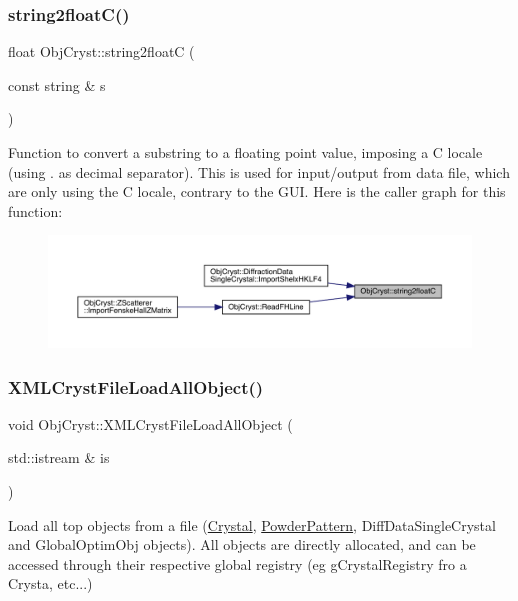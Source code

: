 \subsubsection{\texorpdfstring{string2floatC()}{string2floatC()}}
{\footnotesize\ttfamily float Obj\+Cryst\+::string2floatC (\begin{DoxyParamCaption}\item[{const string \&}]{s }\end{DoxyParamCaption})}

Function to convert a substring to a floating point value, imposing a C locale (using \textquotesingle{}.\textquotesingle{} as decimal separator). This is used for input/output from data file, which are only using the C locale, contrary to the G\+UI. Here is the caller graph for this function\+:
\nopagebreak
\begin{figure}[H]
\begin{center}
\leavevmode
\includegraphics[width=350pt]{namespace_obj_cryst_a5c248549d929fc199e6323d2a1486177_icgraph}
\end{center}
\end{figure}
\mbox{\label{namespace_obj_cryst_a43fd80ec699bfaa352ac950dd95a7c78}} 
\subsubsection{\texorpdfstring{XMLCrystFileLoadAllObject()}{XMLCrystFileLoadAllObject()}\hspace{0.1cm}{\footnotesize\ttfamily [1/2]}}
{\footnotesize\ttfamily void Obj\+Cryst\+::\+X\+M\+L\+Cryst\+File\+Load\+All\+Object (\begin{DoxyParamCaption}\item[{std\+::istream \&}]{is }\end{DoxyParamCaption})}



Load all \textquotesingle{}top\textquotesingle{} objects from a file (\mbox{\hyperlink{class_obj_cryst_1_1_crystal}{Crystal}}, \mbox{\hyperlink{class_obj_cryst_1_1_powder_pattern}{Powder\+Pattern}}, Diff\+Data\+Single\+Crystal and Global\+Optim\+Obj objects). All objects are directly allocated, and can be accessed through their respective global registry (eg g\+Crystal\+Registry fro a Crysta, etc...) 


